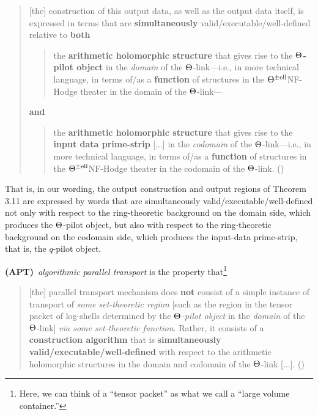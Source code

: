 \documentclass[12pt, reqno, a4paper]{amsart}
\begin{document}
\medskip
\begin{quote}
[the] construction of this output data, as well as the output data itself,
is expressed in terms that are {\bf simultaneously}
valid/executable/well-defined relative to {\bf both}

\smallskip
\begin{quote}
the {\bf arithmetic holomorphic structure} that gives rise to the {\bf
$\Th$-pilot object} in the {\it domain} of the $\Th$-link---i.e., in
more technical language, in terms of/as a {\bf function} of structures in
the $\Th^{\pm\text{ell}}$NF-Hodge theater in the domain of the $\Th$-link---
\end{quote}

\smallskip
{\bf and}

\smallskip
\begin{quote}
the {\bf arithmetic holomorphic structure} that gives rise to the {\bf
input data prime-strip} [...] in the {\it codomain} of the 
$\Th$-link---i.e., in more technical language, in terms of/as a {\bf
function} of structures in the $\Th^{\pm\text{ell}}$NF-Hodge theater in the codomain of
the $\Th$-link. (\cite[Rem.\ 3.11.1(iii), p.\ 583]{MR4225475})
\end{quote}
\end{quote}

\medskip
That is, in our wording, the output construction and output regions of Theorem 3.11 are expressed by words that are simultaneously valid/executable/well-defined not only with respect to the ring-theoretic background on the domain side, which produces the \(\Th\)-pilot object, but also with respect to the ring-theoretic background on the codomain side, which produces the input-data prime-strip, that is, the \(q\)-pilot object. 


\medskip\noindent
{\bf (APT)}\ \emph{algorithmic parallel transport} is the property that\footnote{Here, we can think of a ``tensor packet'' as what we call a ``large volume container.''} 

\medskip
\begin{quote}
[the] parallel transport mechanism does {\bf not} consist of a simple
instance of transport of {\it some set-theoretic region} [such as the
region in the tensor packet of log-shells determined by the {\it
$\Th$-pilot object} in the {\it domain} of the $\Th$-link] {\it via some
set-theoretic function}.  Rather, it consists of a {\bf construction
algorithm} that is {\bf simultaneously valid/executable/well-defined} with
respect to the arithmetic holomorphic structures in the domain and
codomain of the $\Th$-link [...]. (\cite[Rem.\ 3.11.1(iv), p.\ 584]{MR4225475})
\end{quote}
\end{document}
